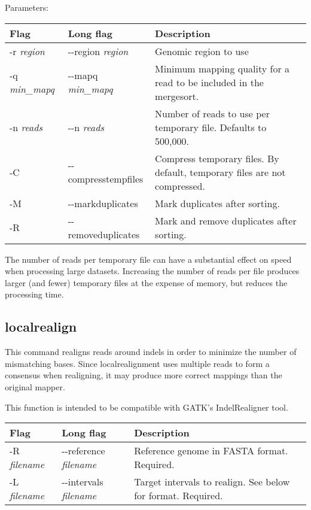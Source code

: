 \documentclass[11pt]{article}
\begin{document}
Parameters:
\begin{center}
\begin{tabular}{llp{3.5in}}
\hline
Flag&Long flag&Description\\ \hline
-r \textit{region}&{-}{-}region \textit{region}&Genomic region to use\\
-q \textit{min\_mapq}&{-}{-}mapq \textit{min\_mapq}&Minimum mapping quality for a read to be included in the mergesort.\\
-n \textit{reads}&{-}{-}n \textit{reads}&Number of reads to use per temporary file. Defaults to 500,000.\\
-C&{-}{-}compresstempfiles&Compress temporary files. By default, temporary files are not compressed.\\
-M&{-}{-}markduplicates&Mark duplicates after sorting.\\
-R&{-}{-}removeduplicates&Mark and remove duplicates after sorting.\\
\end{tabular}
\end{center}

The number of reads per temporary file can have a substantial effect on speed when processing large datasets. Increasing the number of reads per file produces larger (and fewer) temporary files at the expense of memory, but reduces the processing time.

\subsection {localrealign}
This command realigns reads around indels in order to minimize the number of mismatching bases. Since localrealignment uses multiple reads to form a consensus when realigning, it may produce more correct mappings than the original mapper.

This function is intended to be compatible with GATK's IndelRealigner tool.
\begin{center}
\begin{tabular}{llp{3.5in}}
\hline
Flag&Long flag&Description\\ \hline
-R \textit{filename}&{-}{-}reference \textit{filename}&Reference genome in FASTA format. Required.\\
-L \textit{filename}&{-}{-}intervals \textit{filename}&Target intervals to realign. See below for format. Required.\\
\end{tabular}
\end{center}
\end{document}
